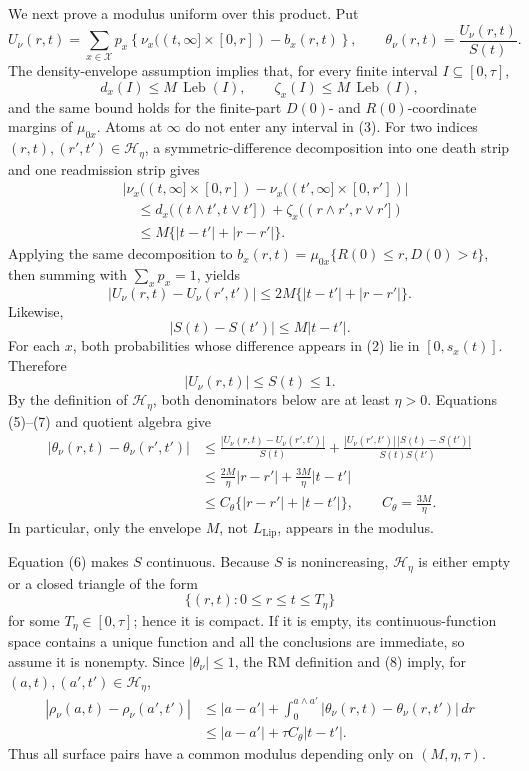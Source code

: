 We next prove a modulus uniform over this product.  Put
\[
 U_\nu(r,t)=\sum_{x\in\mathcal X}p_x
 \left\{\nu_x((t,\infty]\times[0,r])-b_x(r,t)\right\},
 \qquad
 \theta_\nu(r,t)=\frac{U_\nu(r,t)}{S(t)}. \tag{2}
\]
The density-envelope assumption implies that, for every finite interval \(I\subseteq[0,\tau]\),
\[
 d_x(I)\leq M\,\operatorname{Leb}(I),
 \qquad
 \zeta_x(I)\leq M\,\operatorname{Leb}(I), \tag{3}
\]
and the same bound holds for the finite-part \(D(0)\)- and \(R(0)\)-coordinate margins of \(\mu_{0x}\).  Atoms at \(\infty\) do not enter any interval in (3).  For two indices \((r,t),(r',t')\in\mathcal H_\eta\), a symmetric-difference decomposition into one death strip and one readmission strip gives
\[
\begin{aligned}
 &\left|\nu_x((t,\infty]\times[0,r])
 -\nu_x((t',\infty]\times[0,r'])\right|\\
 &\quad\leq d_x((t\wedge t',t\vee t'])
       +\zeta_x((r\wedge r',r\vee r'])\\
 &\quad\leq M\{|t-t'|+|r-r'|\}. 
\end{aligned} \tag{4}
\]
Applying the same decomposition to \(b_x(r,t)=\mu_{0x}\{R(0)\leq r,D(0)>t\}\), then summing with \(\sum_xp_x=1\), yields
\[
 |U_\nu(r,t)-U_\nu(r',t')|
 \leq 2M\{|t-t'|+|r-r'|\}. \tag{5}
\]
Likewise,
\[
 |S(t)-S(t')|\leq M|t-t'|. \tag{6}
\]
For each \(x\), both probabilities whose difference appears in (2) lie in \([0,s_x(t)]\).  Therefore
\[
 |U_\nu(r,t)|\leq S(t)\leq1. \tag{7}
\]
By the definition of \(\mathcal H_\eta\), both denominators below are at least \(\eta>0\).  Equations (5)--(7) and quotient algebra give
\[
\begin{aligned}
 |\theta_\nu(r,t)-\theta_\nu(r',t')|
 &\leq \frac{|U_\nu(r,t)-U_\nu(r',t')|}{S(t)}
 +\frac{|U_\nu(r',t')|\,|S(t)-S(t')|}{S(t)S(t')}\\
 &\leq \frac{2M}{\eta}|r-r'|+\frac{3M}{\eta}|t-t'|\\
 &\leq C_\theta\{|r-r'|+|t-t'|\},
 \qquad C_\theta=\frac{3M}{\eta}. 
\end{aligned} \tag{8}
\]
In particular, only the envelope \(M\), not \(L_{\mathrm{Lip}}\), appears in the modulus.

Equation (6) makes \(S\) continuous.  Because \(S\) is nonincreasing, \(\mathcal H_\eta\) is either empty or a closed triangle of the form
\[
 \{(r,t):0\leq r\leq t\leq T_\eta\}
\]
for some \(T_\eta\in[0,\tau]\); hence it is compact.  If it is empty, its continuous-function space contains a unique function and all the conclusions are immediate, so assume it is nonempty.  Since \(|\theta_\nu|\leq1\), the RM definition and (8) imply, for \((a,t),(a',t')\in\mathcal H_\eta\),
\[
\begin{aligned}
 |\rho_\nu(a,t)-\rho_\nu(a',t')|
 &\leq |a-a'|
 +\int_0^{a\wedge a'}|\theta_\nu(r,t)-\theta_\nu(r,t')|\,dr\\
 &\leq |a-a'|+\tau C_\theta|t-t'|. 
\end{aligned} \tag{9}
\]
Thus all surface pairs have a common modulus depending only on \((M,\eta,\tau)\).


